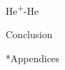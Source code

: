 \documentclass[letterpaper, 12 pt]{report}
\begin{document}
\begin{chapter}{\texorpdfstring{He\textsuperscript{+}}{He+}-He \label{chap:hep-he}}

\end{chapter}

\begin{chapter}{Conclusion \label{chap:con}}

\end{chapter}

\begin{chapter}*{Appendices}

\end{chapter}

\cleardoublepage
{}
{}


\end{document}
